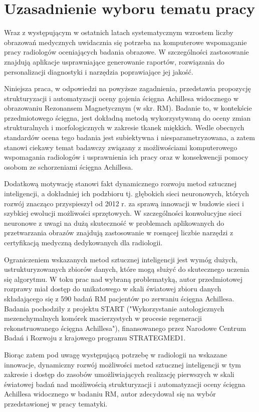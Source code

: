\chapter{Uzasadnienie wyboru tematu pracy}

Wraz z występującym w ostatnich latach systematycznym wzrostem liczby obrazowań medycznych uwidacznia się potrzeba na komputerowe wspomaganie pracy radiologów oceniających badania obrazowe. W szczególności zastosowanie znajdują aplikacje usprawniające generowanie raportów, rozwiązania do personalizacji diagnostyki i narzędzia poprawiające jej jakość.

Niniejsza praca, w odpowiedzi na powyższe zagadnienia, przedstawia propozycję strukturyzacji i automatyzacji oceny gojenia ścięgna Achillesa widocznego w obrazowaniu Rezonansem Magnetycznym (w skr. RM). Badanie to, w kontekście przedmiotowego ścięgna, jest dokładną metodą wykorzystywaną do oceny zmian strukturalnych i morfologicznych w zakresie tkanek miękkich. Wedle obecnych standardów ocena tego badania jest subiektywna i niesparametryzowana, a zatem stanowi ciekawy temat badawczy związany z możliwościami komputerowego wspomagania radiologów i usprawnienia ich pracy oraz w konsekwencji pomocy osobom ze schorzeniami ścięgna Achillesa.

Dodatkową motywację stanowi fakt dynamicznego rozwoju metod sztucznej inteligencji, a dokładniej ich podzbioru tj. głębokich sieci neuronowych, których rozwój znacząco przyspieszył od 2012 r. za sprawą innowacji w budowie sieci i szybkiej ewolucji możliwości sprzętowych. W szczególności konwolucyjne sieci neuronowe z uwagi na dużą skuteczność w problemach aplikowanych do przetwarzania obrazów znajdują zastosowanie w rosnącej liczbie narzędzi z certyfikacją medyczną dedykowanych dla radiologii.

Ograniczeniem wskazanych metod sztucznej inteligencji jest wymóg dużych, ustrukturyzowanych zbiorów danych, które mogą służyć do skutecznego uczenia się algorytmu. W toku prac nad wybraną problematyką, autor przedmiotowej rozprawy miał dostęp do unikatowego w skali światowej zbioru danych składającego się z 590 badań RM pacjentów po zerwaniu ścięgna Achillesa. Badania pochodziły z projektu START ("Wykorzystanie autologicznych mezenchymalnych komórek macierzystych w procesie regeneracji rekonstruowanego ścięgna Achillesa"), finansowanego przez Narodowe Centrum Badań i Rozwoju z krajowego programu STRATEGMED1.

Biorąc zatem pod uwagę występującą potrzebę w radiologii na wskazane innowacje, dynamiczny rozwój możliwości metod sztucznej inteligencji w tym zakresie i dostęp do zasobów umożliwiających realizację pierwszych w skali światowej badań nad możliwością strukturyzacji i automatyzacji oceny ścięgna Achillesa widocznego w badaniu RM, autor zdecydował się na wybór przedstawionej w pracy tematyki.  
 

